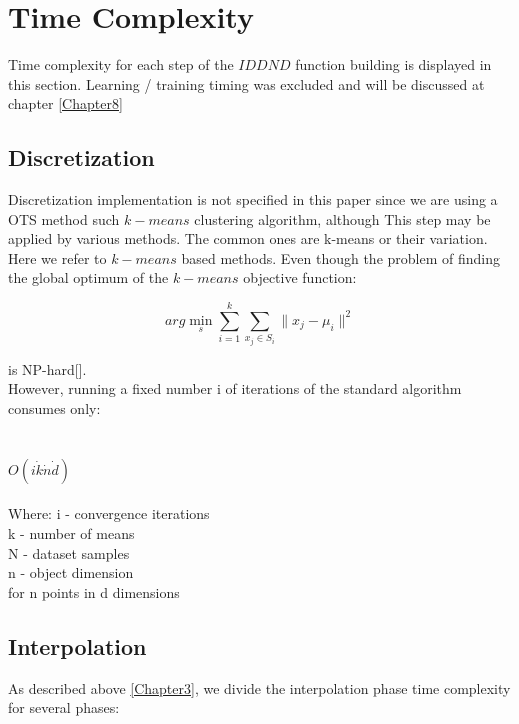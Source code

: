 
\chapter{Time Complexity} %

\label{Chapter6} 
Time complexity for each step of the $IDDND$ function building is displayed in this section. 
Learning / training timing was excluded and will be discussed at chapter \ref{Chapter8}


\section{Discretization}

	Discretization implementation is not specified in this paper since we are using a OTS method such $k-means$ clustering algorithm, although This step may be applied by various methods. 
	The common ones are k-means or their variation. Here we refer to $k-means$ \cite{kmeans} based methods.
	Even though the problem of finding the global optimum of the $k-means$ objective function:
	
	\begin{equation}
	arg\min_s\sum_{i=1}^{k} \sum_{x_j \in S_i}^{}\|x_j - \mu_i \|^2
	\end{equation}
	
	is NP-hard[]. \\
	
	However, running a fixed number i of iterations of the standard algorithm consumes only: \\ \\ \\
	\textbf{$O(i \dot k \dot n \dot d)$} \\ \\
	Where:
	i - convergence iterations \\
	k - number of means \\
	N - dataset samples \\
	n - object dimension \\
    
    for n points in d dimensions
	

\section{Interpolation}

As described above \ref{Chapter3}, we divide the interpolation phase time complexity for several phases:




